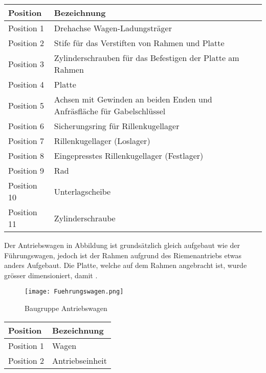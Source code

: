 \documentclass[../../main.tex]{subfiles}
\begin{document}
\begin{table}[H]
    \begin{table}[H] \centering
        \begin{tabular}{|l|l|}
        \hline
        \textbf{Position} & \textbf{Bezeichnung}\\
        \hline
        Position 1          & Drehachse Wagen-Ladungsträger\\
         \hline
        Position 2          & Stife für das Verstiften von Rahmen und Platte\\
        \hline
        Position 3          & Zylinderschrauben für das Befestigen der Platte am Rahmen\\
        \hline
        Position 4          & Platte\\
        \hline
        Position 5          & Achsen mit Gewinden an beiden Enden und Anfräsfläche für Gabelschlüssel\\
        \hline
        Position 6          & Sicherungsring für Rillenkugellager\\
        \hline
        Position 7          & Rillenkugellager (Loslager)\\
        \hline
        Position 8          & Eingepresstes Rillenkugellager (Festlager)\\
        \hline
        Position 9          & Rad\\
        \hline
        Position 10         & Unterlagscheibe\\
        \hline
        Position 11         & Zylinderschraube\\
        \hline
        \end{tabular}

    Der Antriebswagen in Abbildung ist grundsätzlich gleich aufgebaut wie der Führungswagen, jedoch ist der Rahmen aufgrund des Riemenantriebs etwas anders Aufgebaut. Die Platte, welche auf dem Rahmen angebracht ist, wurde grösser dimensioniert, damit  . 

    \begin{figure}[H] %
        \centering
        \texttt{[image: Fuehrungswagen.png]}
        \caption{Baugruppe Antriebswagen}
        \label{fig:Antriebswagen}
    \end{figure} 

    \begin{table}[H] \centering
        \begin{tabular}{|l|l|}
        \hline
        \textbf{Position} & \textbf{Bezeichnung}\\
        \hline
        Position 1          & Wagen\\
         \hline
        Position 2          & Antriebseinheit\\
        \hline
        \end{tabular}


\end{table}
\end{table}
\end{table}
\end{document}
